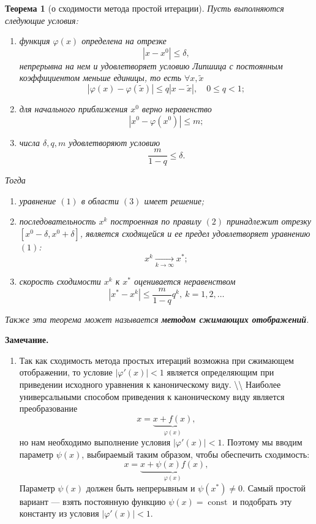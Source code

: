 \documentclass[11pt]{article}
\newtheorem{theorem}{Теорема}
\begin{document}
\begin{theorem}
        [о сходимости метода простой итерации]
        Пусть выполняются следующие условия:\begin{enumerate}
            \item функция $\varphi(x)$ определена на отрезке $$|x - x^0| \leq \delta,$$ непрерывна на нем и удовлетворяет условию Липшица с постоянным коэффициентом меньше единицы, то есть $\forall x, \widetilde{x}$ $$|\varphi(x) - \varphi(\widetilde{x})| \leq q |x - \widetilde{x}| ,\quad 0 \leq q < 1;$$
            \item для начального приближения $x^0$ верно неравенство $$|x^0 - \varphi(x^0)| \leq m;$$
            \item числа $\delta, q, m$ удовлетворяют условию $$\dfrac{m}{1-q}\leq \delta. $$
        \end{enumerate}
        Тогда \begin{enumerate}
            \item уравнение $(1)$ в области $(3)$ имеет решение;
            \item последовательность $x^k$ построенная по правилу $(2)$ принадлежит отрезку $[x^0 - \delta, x^0 + \delta]$, является сходящейся и ее предел удовлетворяет уравнению $(1)$: $$x^k \xrightarrow[k\to \infty]{} x^*;$$
            \item скорость сходимости $x^k$ к $x^*$ оценивается неравенством $$|x^* - x^k| \leq \dfrac{m}{1- q}q^k,\ k = 1,2,\ldots $$
        \end{enumerate}
        Также эта теорема может называется \textbf{методом сжимающих отображений}.
    \end{theorem}

\textbf{Замечание.} \begin{enumerate}
    \item Так как сходимость метода простых итераций возможна при сжимающем
        отображении, то условие \(|\varphi'(x)|<1\) является определяющим при
        приведении исходного уравнения к каноническому виду.
        \textbackslash\textbackslash{} Наиболее универсальными способом
        приведения к каноническому виду является преобразование
        \[x = \underbrace{x+f(x)}_{\varphi(x)},\] но нам необходимо выполнение
        условия \(|\varphi'(x)|<1\). Поэтому мы вводим параметр \(\psi(x)\),
        выбираемый таким образом, чтобы обеспечить сходимость:
        \[x = \underbrace{x+\psi(x)f(x)}_{\varphi(x)},\] Параметр \(\psi(x)\)
        должен быть непрерывным и \(\psi(x^*)\ne 0.\) Самый простой вариант ---
        взять постоянную функцию \(\psi(x)=\operatorname{const}\) и подобрать
        эту константу из условия \(|\varphi'(x)|<1\).
    \end{enumerate}
        
\end{document}

